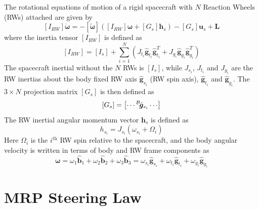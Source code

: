 \documentclass[]{AVSSimReportMemo}
\begin{document}
The rotational equations of motion of a rigid spacecraft with $N$ Reaction Wheels (RWs) attached are given by\cite{schaub}
\begin{equation}
	\label{eq:MS:2}
	[I_{RW}] \dot{\bm \omega} = - [\tilde{\bm \omega}] \left( 
	[I_{RW}] \bm\omega + [G_{s}] \bm h_{s} 
	\right) - [G_{s}] \bm u_{s} + \bm L
\end{equation}
where  the inertia tensor $[I_{RW}]$ is defined as
\begin{equation}
	\label{eq:MS:3}
	[I_{RW}] = [I_{s}] + \sum_{i=1}^{N} \left (J_{t_{i}} \hat{\bm g}_{t_{i}} \hat{\bm g}_{t_{i}}^{T} + J_{g_{i}} \hat{\bm g}_{g_{i}} \hat{\bm g}_{g_{i}}^{T}
	\right)
\end{equation}
The spacecraft inertial without the $N$ RWs is $[I_{s}]$, while $J_{s_{i}}$, $J_{t_{i}}$ and $J_{g_{i}}$ are the RW inertias about the body fixed RW axis $\hat{\bm g}_{s_{i}}$ (RW spin axis), $\hat{\bm g}_{t_{i}}$ and $\hat{\bm g}_{g_{i}}$.  The $3\times N$ projection matrix $[G_{s}]$ is then defined as
\begin{equation}
	\label{eq:MS:4}
	[G_{s}] = \begin{bmatrix}
		\cdots \leftexp{B}{\hat{\bm g}}_{s_{i}} \cdots
	\end{bmatrix}
\end{equation}
The RW inertial angular momentum vector $\bm h_{s}$ is defined as
\begin{equation}
	\label{eq:MS:5}
	h_{s_{i}} = J_{s_{i}} (\omega_{s_{i}} + \Omega_{i})
\end{equation}
Here $\Omega_{i}$ is the $i^{\text{th}}$ RW spin relative to the spacecraft, and the body angular velocity is written in terms of body and RW frame components as
\begin{equation}
	\label{eq:MS:6}
	\bm\omega = \omega_{1} \hat{\bm b}_{1} + \omega_{2} \hat{\bm b}_{2} + \omega_{3} \hat{\bm b}_{3}
	= \omega_{s_{i}} \hat{\bm g}_{s_{i}} +  \omega_{t_{i}} \hat{\bm g}_{t_{i}} +  \omega_{g_{i}} \hat{\bm g}_{g_{i}}
\end{equation}









\section{MRP Steering Law}
\end{document}
